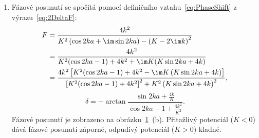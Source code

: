 \begin{solution}
\begin{enumerate}
	\item
		Fázové posunutí se spočítá pomocí definičního vztahu~\eqref{eq:PhaseShift} z výrazu~\eqref{eq:2DeltaF}:
		\begin{align}
            F&=\frac{4k^{2}}{K^{2}\left(\cos{2ka}+\im\sin{2ka}\right)-\left(K-2\im k\right)^{2}}\nonumber\\
			 &=\frac{4k^{2}}{K^{2}(\cos{2ka}-1)+4k^{2}+\im K(K\sin{2ka}+4k)}\nonumber\\
			 &=\frac{4k^{2}\left[K^{2}(\cos{2ka}-1)+4k^{2}-\im K\left(K\sin{2ka}+4k\right)\right]}{\left[K^{2}(\cos{2ka}-1)+4k^{2}\right]^{2}+K^{2}\left(K\sin{2ka}+4k\right)^{2}},
		\end{align}
		\begin{equation}
			\delta=-\arctan\frac{\sin{2ka}+\frac{4k}{K}}{\cos{2ka}-1+\frac{4k^{2}}{K^{2}}}.
		\end{equation}
		Fázové posunutí je zobrazeno na obrázku~\ref{fig:DoubleDelta}~(b).
		Přitažlivý potenciál ($K<0$) dává fázové posunutí záporné, odpudivý potenciál ($K>0$) kladné.
		
		\begin{figure}[!htbp]
            \begin{subfigure}{0.49\linewidth}
                \centering{}
            \end{subfigure}
            \hfill
            \begin{subfigure}{0.49\linewidth}
                \centering{}
            \end{subfigure}
			\label{fig:DoubleDelta}
		\end{figure}		
				
	\end{enumerate}
\end{solution}